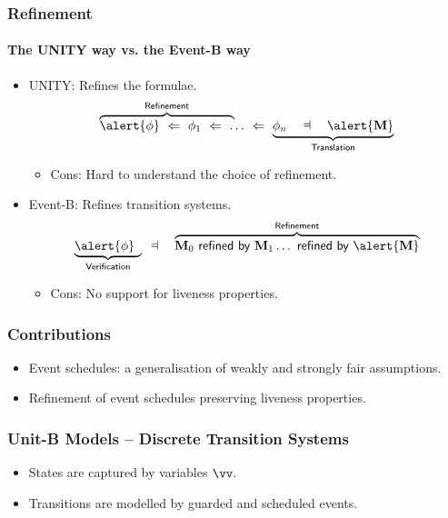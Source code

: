



\begin{frame}
  \frametitle{Refinement}
  \framesubtitle{The UNITY way vs. the Event-B way}


  \begin{itemize}
  \item UNITY: Refines the \alert{formulae}.
    \[
    \lefteqn{\overbrace{\phantom{\phi \wide\follows \phi_1
          \wide\follows \ldots \wide\follows
          \phi_n}}^{\textsf{Refinement}}} \alert{\phi} \wide\follows \phi_1
    \wide\follows \ldots \wide\follows \underbrace{\phi_n \WIDE\dashV
      \alert{\Mch}}_{\textsf{Translation}}
    \]
    \begin{itemize}
    \item<2-> Cons: \alert{Hard to understand} the choice of refinement.
    \end{itemize}
    \medskip

  \item Event-B: Refines \alert{transition systems}.
    \[
    \lefteqn{
      \underbrace{\phantom{\phi \WIDE\dashV
        \Mch_0}}_{\textsf{Verification}}}  \alert{\phi} \WIDE\dashV
        \overbrace{\Mch_0 \wide\abstracts \Mch_1 \ldots \wide\abstracts \alert{\Mch}}^{\textsf{Refinement}}
    \]
    \begin{itemize}
    \item<2-> Cons: No support for \alert{liveness properties}.
    \end{itemize}
  \end{itemize}

\end{frame}

\begin{frame}
  \frametitle{Contributions}

  \begin{itemize}
  \item Event schedules: a generalisation of weakly and strongly fair
    assumptions.
    \medskip
  \item Refinement of event schedules preserving liveness properties.
  \end{itemize}
\end{frame}

\begin{frame}
  \frametitle{Unit-B Models -- Discrete Transition Systems}

  \begin{itemize}
  \item States are captured by \alert{variables $\vv$}.
    \medskip
  \item Transitions are modelled by \alert{guarded and scheduled events}.
  \end{itemize}

\end{frame}

